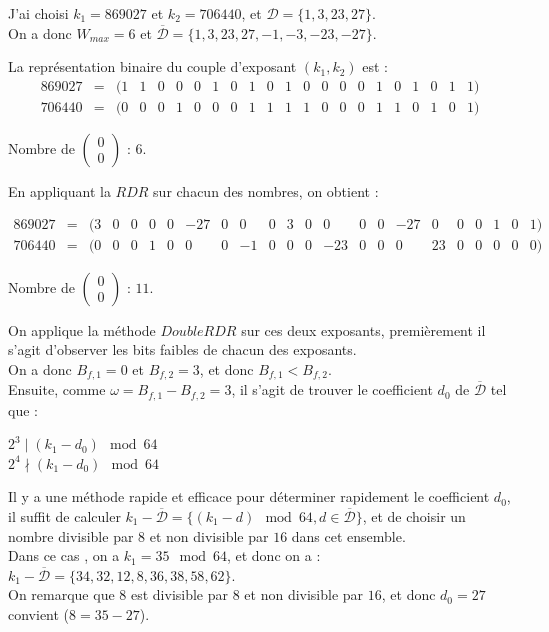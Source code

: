 \documentclass[12pt, a4paper]{memoir}
\newcommand{\doublezero}{\begin{pmatrix} 0 \\ 0 \end{pmatrix}}
\newcommand{\dbarre}{\overline{\mathcal{D}}}
\begin{document}
J'ai choisi $k_1 = 869027$ et $k_2 = 706440$, et $\mathcal{D} = \{1,3,23,27\}$. \\
On a donc $W_{max} = 6$ et $\dbarre = \{1,3,23,27,-1,-3,-23,-27\}$.

La représentation binaire du couple d'exposant $(k_1,k_2)$ est :
$$\begin{array}{cccccccccccccccccccccc}
  869027 & = & (1 & 1 & 0 & 0 & 0 & 1 & 0 & 1 & 0 & 1 & 0 & 0 & 0 & 0 & 1 & 0 & 1 & 0 & 1 & 1) \\
  706440 & = & (0 & 0 & 0 & 1 & 0 & 0 & 0 & 1 & 1 & 1 & 1 & 0 & 0 & 0 & 1 & 1 & 0 & 1 & 0 & 1)
 \end{array}$$
 
 Nombre de $\doublezero$ : $6$.

 En appliquant la $RDR$ sur chacun des nombres, on obtient :
 
 $$\begin{array}{ccccccccccccccccccccccc}
  869027 & = & (3 & 0 & 0 & 0 & 0 & -27 & 0 & 0 & 0 & 3 & 0 & 0 & 0 & 0 & -27 & 0 & 0 & 0 & 1 & 0 & 1) \\
  706440 & = & (0 & 0 & 0 & 1 & 0 & 0 & 0 & -1 & 0 & 0 & 0 & -23 & 0 & 0 & 0 & 23 & 0 & 0 & 0 & 0 & 0)
 \end{array}$$

 Nombre de $\doublezero$ : $11$.
 
On applique la méthode $DoubleRDR$ sur ces deux exposants, premièrement il s'agit d'observer les bits faibles de chacun 
des exposants. \\
On a donc $B_{f,1} = 0$ et $B_{f,2} = 3$, et donc $B_{f,1} < B_{f,2}$. \\
Ensuite, comme $\omega = B_{f,1} - B_{f,2} = 3$, il s'agit de trouver le coefficient $d_0$ de $\dbarre$ tel que :
   \begin{center}
    $2^{3} \mid (k_1 - d_0) \mod 64$ \\
    $2^{4} \nmid (k_1 - d_0) \mod 64$
   \end{center}

   Il y a une méthode rapide et efficace pour déterminer rapidement le coefficient $d_0$, il suffit de calculer
   $k_1 - \dbarre = \{(k_1 - d) \mod 64, d \in \dbarre\}$, et de choisir un nombre divisible par $8$ et non 
   divisible par $16$ dans cet ensemble. \\
   Dans ce cas , on a $k_1 = 35 \mod 64$, et donc on a : \\
 $k_1 - \dbarre = \{34,32,12,8,36,38,58,62\}$. \\
 On remarque que $8$ est divisible par $8$ et non divisible par $16$, et donc $d_0 = 27$ convient ($8 = 35-27$).
 
\end{document}
